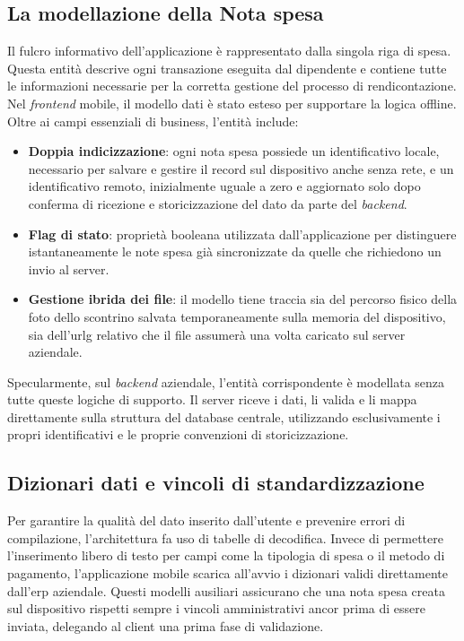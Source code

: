 \subsection*{La modellazione della Nota spesa}
\noindent Il fulcro informativo dell'applicazione è rappresentato dalla singola riga di spesa. Questa entità descrive ogni transazione eseguita dal dipendente e contiene tutte le informazioni necessarie per la corretta gestione del processo di rendicontazione. Nel \textit{frontend} mobile, il modello dati è stato esteso per supportare la logica offline. Oltre ai campi essenziali di business, l'entità include:
\begin{itemize}
    \item \textbf{Doppia indicizzazione}: ogni nota spesa possiede un identificativo locale, necessario per salvare e gestire il record sul dispositivo anche senza rete, e un identificativo remoto, inizialmente uguale a zero e aggiornato solo dopo conferma di ricezione e storicizzazione del dato da parte del \textit{backend}.
    \item \textbf{Flag di stato}: proprietà booleana utilizzata dall'applicazione per distinguere istantaneamente le note spesa già sincronizzate da quelle che richiedono un invio al server.
    \item \textbf{Gestione ibrida dei file}: il modello tiene traccia sia del percorso fisico della foto dello scontrino salvata temporaneamente sulla memoria del dispositivo, sia dell'\gls{urlg} relativo che il file assumerà una volta caricato sul server aziendale.
\end{itemize}
\noindent Specularmente, sul \textit{backend} aziendale, l'entità corrispondente è modellata senza tutte queste logiche di supporto. Il server riceve i dati, li valida e li mappa direttamente sulla struttura del database centrale, utilizzando esclusivamente i propri identificativi e le proprie convenzioni di storicizzazione.

\subsection*{Dizionari dati e vincoli di standardizzazione}
\noindent Per garantire la qualità del dato inserito dall'utente e prevenire errori di compilazione, l'architettura fa uso di tabelle di decodifica. Invece di permettere l'inserimento libero di testo per campi come la tipologia di spesa o il metodo di pagamento, l'applicazione mobile scarica all'avvio i dizionari validi direttamente dall'\gls{erp} aziendale. Questi modelli ausiliari assicurano che una nota spesa creata sul dispositivo rispetti sempre i vincoli amministrativi ancor prima di essere inviata, delegando al client una prima fase di validazione.

